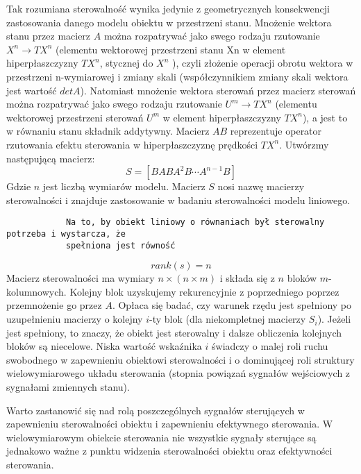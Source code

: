 \documentclass{article}
\begin{document}
		Tak rozumiana sterowalność wynika jedynie z geometrycznych konsekwencji
		zastosowania danego modelu obiektu w przestrzeni stanu. Mnożenie wektora stanu
		przez macierz $A$ można rozpatrywać jako swego rodzaju 
		rzutowanie $X^n \rightarrow TX^n$ (elementu
		wektorowej przestrzeni stanu Xn w element hiperpłaszczyzny $TX^n$,
		stycznej do $X^n$ ), czyli złożenie operacji
		obrotu wektora w przestrzeni n-wymiarowej i zmiany skali
		(współczynnikiem zmiany skali wektora jest wartość $det A$). Natomiast mnożenie
		wektora sterowań przez macierz sterowań można rozpatrywać jako swego rodzaju
		rzutowanie $U^m \rightarrow TX^n$ (elementu wektorowej przestrzeni sterowań
		$U^m$ w element
		hiperpłaszczyzny $TX^n$), a jest to w równaniu stanu składnik addytywny. Macierz $AB$
		reprezentuje operator rzutowania efektu sterowania w hiperpłaszczyznę prędkości $TX^n$.
		Utwórzmy następującą macierz:
		\begin{equation}
			S = [ B AB A^2B \cdots A^{n-1}B]
		\end{equation}
		Gdzie $n$ jest liczbą wymiarów modelu.
		Macierz $S$ nosi nazwę macierzy sterowalności i znajduje zastosowanie w
		badaniu sterowalności modelu liniowego.

		\begin{verbatim}
			Na to, by obiekt liniowy o równaniach był sterowalny potrzeba i wystarcza, że
			spełniona jest równość
		\end{verbatim}
		\begin{equation}
			rank(s) = n
		\end{equation}
		Macierz sterowalności ma wymiary $n\times(n\times m)$ 
		i składa się z $n$ bloków $m$-kolumnowych.
		Kolejny blok uzyskujemy rekurencyjnie z poprzedniego poprzez przemnożenie go przez
		$A$. Opłaca się badać, czy warunek rzędu jest spełniony po uzupełnieniu macierzy o kolejny
		$i$-ty blok (dla niekompletnej macierzy $S_i$).
		Jeżeli jest spełniony, to znaczy, że obiekt jest
		sterowalny i dalsze obliczenia kolejnych bloków są niecelowe. Niska wartość wskaźnika
		$i$ świadczy o malej roli ruchu swobodnego w zapewnieniu obiektowi sterowalności i o
		dominującej roli struktury wielowymiarowego układu sterowania (stopnia powiązań
		sygnałów wejściowych z sygnałami zmiennych stanu).

		Warto zastanowić się nad rolą poszczególnych sygnałów sterujących w zapewnieniu
		sterowalności obiektu i zapewnieniu efektywnego sterowania. W wielowymiarowym
		obiekcie sterowania nie wszystkie sygnały sterujące są jednakowo ważne z punktu
		widzenia sterowalności obiektu oraz efektywności sterowania.
\end{document}
